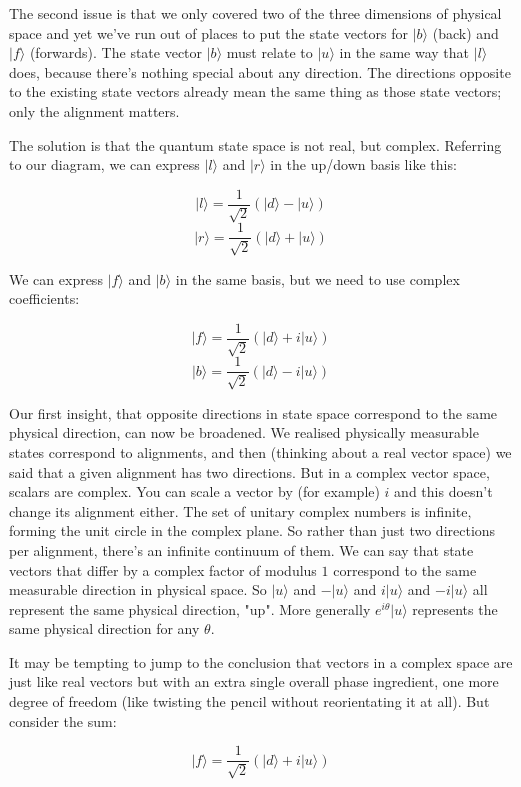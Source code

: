 The second issue is that we only covered two of the three dimensions of physical space and yet we've run out of places to put the state vectors for $|b\rangle$ (back) and $|f\rangle$ (forwards). The state vector $|b\rangle$ must relate to $|u\rangle$ in the same way that $|l\rangle$ does, because there's nothing special about any direction. The directions opposite to the existing state vectors already mean the same thing as those state vectors; only the alignment matters.

The solution is that the quantum state space is not real, but complex. Referring to our diagram, we can express $|l\rangle$ and $|r\rangle$ in the up/down basis like this:

$$
|l\rangle = \frac{1}{\sqrt{2}}(|d\rangle - |u\rangle)
$$
$$
|r\rangle = \frac{1}{\sqrt{2}}(|d\rangle + |u\rangle)
$$

We can express $|f\rangle$ and $|b\rangle$ in the same basis, but we need to use complex coefficients:

$$
|f\rangle = \frac{1}{\sqrt{2}}(|d\rangle + i|u\rangle)
$$
$$
|b\rangle = \frac{1}{\sqrt{2}}(|d\rangle - i|u\rangle)
$$

Our first insight, that opposite directions in state space correspond to the same physical direction, can now be broadened. We realised physically measurable states correspond to alignments, and then (thinking about a real vector space) we said that a given alignment has two directions. But in a complex vector space, scalars are complex. You can scale a vector by (for example) $i$ and this doesn't change its alignment either. The set of unitary complex numbers is infinite, forming the unit circle in the complex plane. So rather than just two directions per alignment, there's an infinite continuum of them. We can say that state vectors that differ by a complex factor of modulus $1$ correspond to the same measurable direction in physical space. So $|u\rangle$ and $-|u\rangle$ and $i|u\rangle$ and $-i|u\rangle$ all represent the same physical direction, "up". More generally $e^{i\theta}|u\rangle$ represents the same physical direction for any $\theta$.

It may be tempting to jump to the conclusion that vectors in a complex space are just like real vectors but with an extra single overall phase ingredient, one more degree of freedom (like twisting the pencil without reorientating it at all). But consider the sum:

$$
|f\rangle = \frac{1}{\sqrt{2}}(|d\rangle + i|u\rangle)
$$

